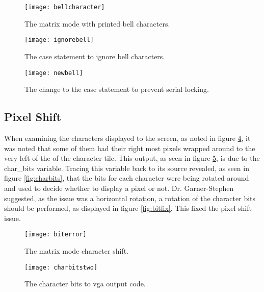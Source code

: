 \begin{figure}
  \centering
  \texttt{[image: bellcharacter]}
  \caption{The matrix mode with printed bell characters.}
  \label{fig:bellcharacter}
\end{figure}

\begin{figure}
  \centering
  \texttt{[image: ignorebell]}
  \caption{The case statement to ignore bell characters.}
  \label{fig:ignorebell}
\end{figure}

\begin{figure}
  \centering
  \texttt{[image: newbell]}
  \caption{The change to the case statement to prevent serial locking.}
  \label{fig:newbell}
\end{figure}


\subsection{Pixel Shift}

\label{Ch5 Sec3 Sub3}

When examining the characters displayed to the screen, as noted in figure \ref{fig:biterror}, it was noted that some of them had their right most pixels wrapped around to the very left of the of the character tile. This output, as seen in figure \ref{fig:charbitstwo}, is due to the char\_bits variable. Tracing this variable back to its source revealed, as seen in figure \ref{fig:charbits}, that the bits for each character were being rotated around and used to decide whether to display a pixel or not. Dr. Garner-Stephen suggested, as the issue was a horizontal rotation, a rotation of the character bits should be performed, as displayed in figure \ref{fig:bitfix}. This fixed the pixel shift issue.

\begin{figure}
  \centering
  \texttt{[image: biterror]}
  \caption{The matrix mode character shift.}
  \label{fig:biterror}
\end{figure}

\begin{figure}
  \centering
  \texttt{[image: charbitstwo]}
  \caption{The character bits to vga output code.}
  \label{fig:charbitstwo}
\end{figure}

